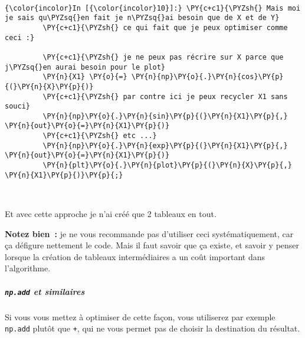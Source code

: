     \begin{center}
    \end{center}
    { \hspace*{\fill} \\}
    
    \begin{Verbatim}[commandchars=\\\{\},frame=single,framerule=0.3mm,rulecolor=\color{cellframecolor}]
{\color{incolor}In [{\color{incolor}10}]:} \PY{c+c1}{\PYZsh{} Mais moi je sais qu\PYZsq{}en fait je n\PYZsq{}ai besoin que de X et de Y}
         \PY{c+c1}{\PYZsh{} ce qui fait que je peux optimiser comme ceci :}
         
         \PY{c+c1}{\PYZsh{} je ne peux pas récrire sur X parce que j\PYZsq{}en aurai besoin pour le plot}
         \PY{n}{X1} \PY{o}{=} \PY{n}{np}\PY{o}{.}\PY{n}{cos}\PY{p}{(}\PY{n}{X}\PY{p}{)}
         \PY{c+c1}{\PYZsh{} par contre ici je peux recycler X1 sans souci}
         \PY{n}{np}\PY{o}{.}\PY{n}{sin}\PY{p}{(}\PY{n}{X1}\PY{p}{,} \PY{n}{out}\PY{o}{=}\PY{n}{X1}\PY{p}{)}
         \PY{c+c1}{\PYZsh{} etc ...}
         \PY{n}{np}\PY{o}{.}\PY{n}{exp}\PY{p}{(}\PY{n}{X1}\PY{p}{,} \PY{n}{out}\PY{o}{=}\PY{n}{X1}\PY{p}{)}
         \PY{n}{plt}\PY{o}{.}\PY{n}{plot}\PY{p}{(}\PY{n}{X}\PY{p}{,} \PY{n}{X1}\PY{p}{)}\PY{p}{;}
\end{Verbatim}


    \begin{center}
    \end{center}
    { \hspace*{\fill} \\}
    
    Et avec cette approche je n'ai créé que 2 tableaux en tout.

    \textbf{Notez bien~:} je ne vous recommande pas d'utiliser ceci
systématiquement, car ça défigure nettement le code. Mais il faut savoir
que ça existe, et savoir y penser lorsque la création de tableaux
intermédiaires a un coût important dans l'algorithme.

    \hypertarget{np.add-et-similaires}{%
\subparagraph{\texorpdfstring{\texttt{np.add} et
similaires}{np.add et similaires}}\label{np.add-et-similaires}}

    Si vous vous mettez à optimiser de cette façon, vous utiliserez par
exemple \texttt{np.add} plutôt que \texttt{+}, qui ne vous permet pas de
choisir la destination du résultat.

